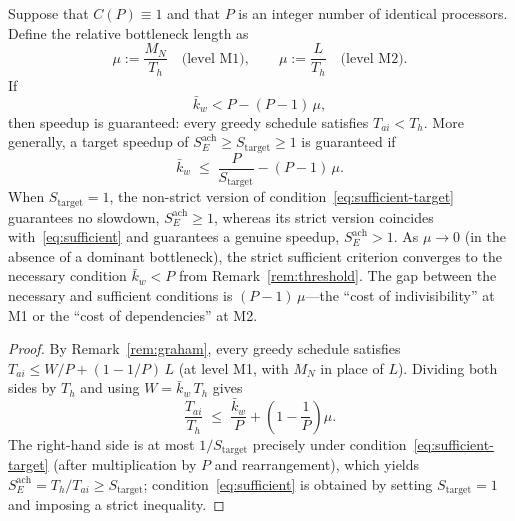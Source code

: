 \begin{theorem}\label{thm:sufficient}
Suppose that $C(P) \equiv 1$ and that $P$ is an integer number of identical processors. Define the relative bottleneck length as
\[
  \mu := \frac{M_N}{T_h} \quad \text{(level M1)}, \qquad \mu := \frac{L}{T_h} \quad \text{(level M2)}.
\]
If
\begin{equation}\label{eq:sufficient}
  \bar{k}_w < P - (P - 1)\, \mu,
\end{equation}
then speedup is guaranteed: every greedy schedule satisfies $T_{ai} < T_h$. More generally, a target speedup of $S_E^{\text{ach}} \ge S_{\text{target}} \ge 1$ is guaranteed if
\begin{equation}\label{eq:sufficient-target}
  \bar{k}_w \;\le\; \frac{P}{S_{\text{target}}} - (P - 1)\, \mu.
\end{equation}
When $S_{\text{target}} = 1$, the non-strict version of condition~\eqref{eq:sufficient-target}
guarantees no slowdown, $S_E^{\mathrm{ach}}\ge1$, whereas its
strict version coincides with~\eqref{eq:sufficient} and guarantees a genuine
speedup, $S_E^{\mathrm{ach}}>1$. As $\mu \to 0$ (in the absence of a dominant
bottleneck), the strict sufficient criterion converges to the necessary
condition $\bar{k}_w < P$ from Remark~\ref{rem:threshold}. The gap between the
necessary and sufficient conditions is $(P-1)\,\mu$---the ``cost of
indivisibility'' at M1 or the ``cost of dependencies'' at M2.
\end{theorem}

\begin{proof}
By Remark~\ref{rem:graham}, every greedy schedule satisfies $T_{ai} \le W/P + (1 - 1/P)\,L$ (at level M1, with $M_N$ in place of $L$). Dividing both sides by $T_h$ and using $W = \bar{k}_w\,T_h$ gives
\[
  \frac{T_{ai}}{T_h} \;\le\; \frac{\bar{k}_w}{P} + \left(1 - \frac{1}{P}\right) \mu.
\]
The right-hand side is at most $1/S_{\text{target}}$ precisely under condition~\eqref{eq:sufficient-target} (after multiplication by $P$ and rearrangement), which yields $S_E^{\text{ach}} = T_h/T_{ai} \ge S_{\text{target}}$; condition~\eqref{eq:sufficient} is obtained by setting $S_{\text{target}} = 1$ and imposing a strict inequality.
\end{proof}

